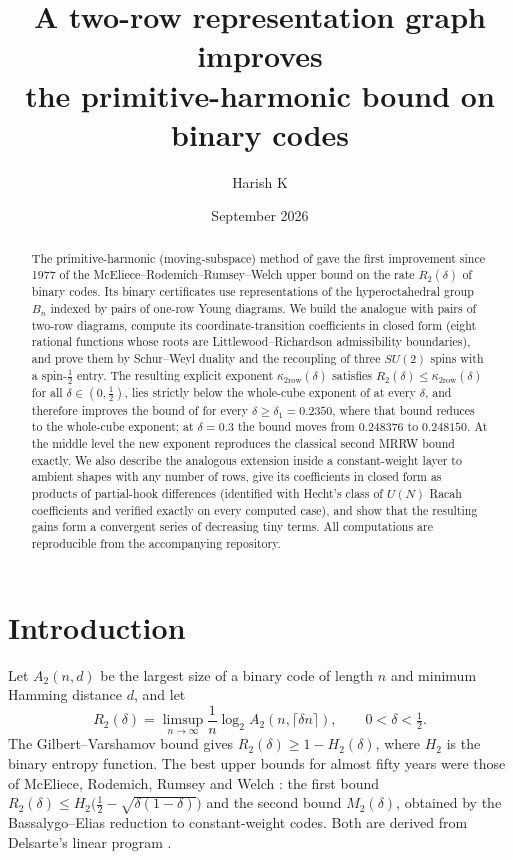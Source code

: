 \documentclass[11pt]{amsart}
\title[A two-row representation graph for binary codes]{A two-row representation graph improves\\ the primitive-harmonic bound on binary codes}
\author{Harish K}
\date{September 2026}
\theoremstyle{definition}
\newcommand{\Htwo}{H_2}
\begin{document}
\begin{abstract}
The primitive-harmonic (moving-subspace) method of \cite{OAI2026} gave the first improvement since 1977 of the McEliece--Rodemich--Rumsey--Welch upper bound on the rate $R_2(\delta)$ of binary codes. Its binary certificates use representations of the hyperoctahedral group $B_n$ indexed by pairs of one-row Young diagrams. We build the analogue with pairs of two-row diagrams, compute its coordinate-transition coefficients in closed form (eight rational functions whose roots are Littlewood--Richardson admissibility boundaries), and prove them by Schur--Weyl duality and the recoupling of three $SU(2)$ spins with a spin-$\tfrac12$ entry. The resulting explicit exponent $\kappa_{2\mathrm{row}}(\delta)$ satisfies $R_2(\delta)\le\kappa_{2\mathrm{row}}(\delta)$ for all $\delta\in(0,\tfrac12)$, lies strictly below the whole-cube exponent of \cite{OAI2026} at every $\delta$, and therefore improves the bound of \cite[Thm.~1.1]{OAI2026} for every $\delta\ge\delta_1=0.2350$, where that bound reduces to the whole-cube exponent; at $\delta=0.3$ the bound moves from $0.248376$ to $0.248150$. At the middle level the new exponent reproduces the classical second MRRW bound exactly. We also describe the analogous extension inside a constant-weight layer to ambient shapes with any number of rows, give its coefficients in closed form as products of partial-hook differences (identified with Hecht's class of $U(N)$ Racah coefficients and verified exactly on every computed case), and show that the resulting gains form a convergent series of decreasing tiny terms. All computations are reproducible from the accompanying repository.
\end{abstract}

\maketitle

\section{Introduction}

Let $A_2(n,d)$ be the largest size of a binary code of length $n$ and minimum Hamming distance $d$, and let
\[
R_2(\delta)=\limsup_{n\to\infty}\frac1n\log_2 A_2(n,\lceil\delta n\rceil),\qquad 0<\delta<\tfrac12 .
\]
The Gilbert--Varshamov bound gives $R_2(\delta)\ge1-\Htwo(\delta)$, where $\Htwo$ is the binary entropy function. The best upper bounds for almost fifty years were those of McEliece, Rodemich, Rumsey and Welch \cite{MRRW}: the first bound $R_2(\delta)\le\Htwo\big(\tfrac12-\sqrt{\delta(1-\delta)}\big)$ and the second bound $M_2(\delta)$, obtained by the Bassalygo--Elias reduction to constant-weight codes. Both are derived from Delsarte's linear program \cite{Delsarte}.
\end{document}

